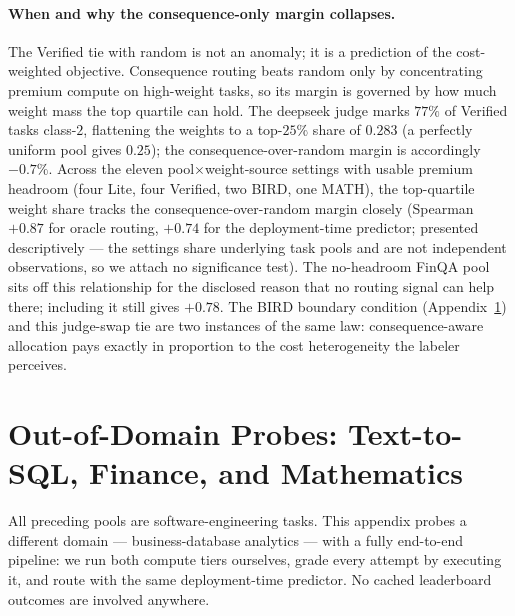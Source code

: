 \documentclass{article}
\begin{document}
\paragraph{When and why the consequence-only margin collapses.} The
Verified tie with random is not an anomaly; it is a prediction of the
cost-weighted objective. Consequence routing beats random only by
concentrating premium compute on high-weight tasks, so its margin is
governed by how much weight mass the top quartile can hold. The
deepseek judge marks $77\%$ of Verified tasks class-$2$, flattening
the weights to a top-$25\%$ share of $0.283$ (a perfectly uniform
pool gives $0.25$); the consequence-over-random margin is accordingly
$-0.7\%$. Across the eleven pool$\times$weight-source settings with usable
premium headroom (four Lite, four Verified, two BIRD, one MATH), the
top-quartile weight share tracks the consequence-over-random margin
closely (Spearman $+0.87$ for oracle routing, $+0.74$ for the
deployment-time predictor; presented descriptively --- the settings
share underlying task pools and are not independent observations, so
we attach no significance test). The no-headroom FinQA pool sits off
this relationship for the disclosed reason that no routing signal
can help there; including it still gives $+0.78$.
The BIRD boundary condition (Appendix~\ref{app:ood}) and this
judge-swap tie are two instances of the same law: consequence-aware
allocation pays exactly in proportion to the cost heterogeneity the
labeler perceives.

\section{Out-of-Domain Probes: Text-to-SQL, Finance, and Mathematics}
\label{app:ood}

All preceding pools are software-engineering tasks. This appendix
probes a different domain --- business-database analytics --- with a
fully end-to-end pipeline: we run both compute tiers ourselves,
grade every attempt by executing it, and route with the same
deployment-time predictor. No cached leaderboard outcomes are
involved anywhere.
\end{document}

